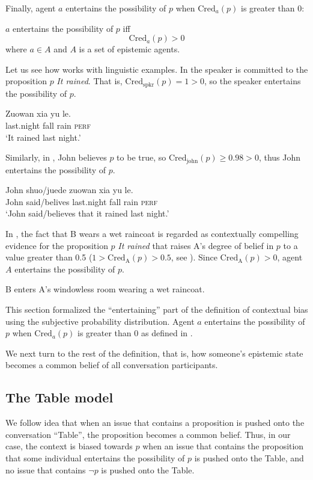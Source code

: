 \documentclass[output=paper,colorlinks,citecolor=brown]{langscibook}
\begin{document}
Finally, agent  $a$ entertains the possibility of $p$ when $\mathrm{Cred}_a(p)$ is greater than 0:

\ea\label{33} $a$ entertains the possibility of $p$   iff
\begin{displaymath}
\mathrm{Cred}_{a}(p) > 0
\end{displaymath}
where $a\in  A$ and $A$ is a set of epistemic agents.
\z

Let us see how  works with linguistic examples.  In  the speaker is committed to the proposition $p$ \textit{It rained}. That is,  $\mathrm{Cred}_{\mathrm{spkr}}(p)=1>0$, so the speaker entertains the possibility of $p$.


\ea\label{4.56wr}
 \gll Zuowan xia yu le.\\
last.night fall rain \textsc{perf}\\
\glt `It rained last night.'
\z


Similarly, in ,  John believes $p$ to be true, so $\mathrm{Cred}_\mathrm{john}(p)\geqslant 0.98>0$, thus John entertains the possibility of $p$.

\ea\label{Johnwr1}
\gll John shuo/juede zuowan xia yu le.\\
John said/belives last.night fall rain \textsc{perf}\\
\glt `John said/believes that it rained last night.'
\z


In , the fact that B wears a wet raincoat is regarded as contextually compelling evidence \citep{BG} for the proposition $p$ \textit{It rained} that raises A's degree of belief in $p$ to a value greater than 0.5 ($1 > \mathrm{Cred}_{\mathrm{A}}(p) > 0.5$, see \citealt{MO2007}).   Since $ \mathrm{Cred}_{\mathrm{A}}(p) > 0$, agent $A$ entertains the possibility of $p$.


\ea \label{4.55w} B enters A's windowless room wearing a  wet raincoat.
\z


This section formalized the ``entertaining'' part of the definition of contextual bias  using the subjective probability distribution.  Agent $a$ entertains the possibility of $p$ when $ \mathrm{Cred}_{a}({p})$ is greater than $0$ as defined in .

We next turn to the rest of the definition, that is, how someone's epistemic state becomes a common belief of all conversation participants.

\subsection{The Table model}\label{subsec:tab}
We follow  idea that when an issue that contains a proposition is pushed onto the conversation ``Table'', the proposition becomes a common belief.  Thus, in our case,  the context is biased towards $p$ when an issue that contains the proposition that some individual entertains the possibility of $p$ is pushed onto the Table, and no issue that contains $\neg p$ is  pushed onto the Table.
\end{document}
